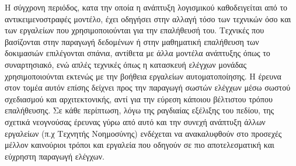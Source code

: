 \documentclass[12pt]{article}
\begin{document}
Η σύγχρονη περιόδος, κατα την οποία η ανάπτυξη λογισμικού καθοδειγείται από το αντικειμενοστραφές μοντέλο, έχει οδηγήσει στην αλλαγή τόσο των τεχνικών όσο και των εργαλείων που χρησιμοποιούνται για την επαλήθευσή του. Τεχνικές που βασίζονται στην παραγωγή δεδομένων ή στην μαθηματική επαλήθευση των δοκιμασιών επιλέγονται σπάνια, αντίθετα με άλλα μοντέλα ανάπτυξης όπως το συναρτησιακό, ενώ απλές τεχνικές όπως η κατασκευή ελέγχων μονάδας χρησιμοποιούνται εκτενώς με την βοήθεια εργαλείων αυτοματοποίησης. Η έρευνα στον τομέα αυτόν επίσης δείχνει προς την παραγωγή σωστών ελέγχων μέσω σωστού σχεδιασμού και αρχιτεκτονικής, αντί για την εύρεση κάποιου βέλτιστου τρόπου επαλήθευσης. Σε κάθε περίπτωση, λόγω της ραγδιαίας εξέλιξης του πεδίου, της σχετικά νεογνούσας έρευνας γύρω από αυτό και την συνεχή ανάπτυξη άλλων εργαλείων (π.χ Τεχνητής Νοημοσύνης) ενδέχεται να ανακαλυφθούν στο προσεχές μέλλον καινούριοι τρόποι και εργαλεία που οδηγούν σε πιο αποτελεσματική και εύχρηστη παραγωγή ελέγχων.

\printbibliography
\end{document}
